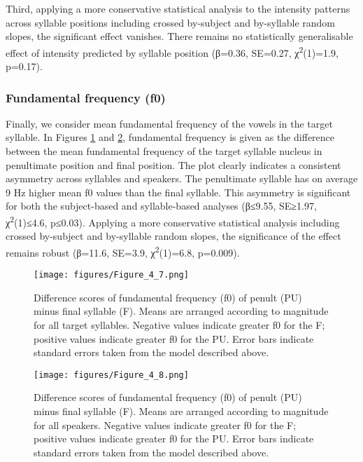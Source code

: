 Third, applying a more conservative statistical analysis to the intensity patterns across syllable positions including crossed by-subject and by-syllable random slopes, the significant effect vanishes. There remains no statistically generalisable effect of intensity predicted by syllable position (β=0.36, SE=0.27, χ\textsuperscript{2}(1)=1.9, p=0.17).

\subsubsection{Fundamental frequency (f0)}
Finally, we consider mean fundamental frequency of the vowels in the target syllable. In Figures \ref{fig:4.7} and \ref{fig:4.8}, fundamental frequency is given as the difference between the mean fundamental frequency of the target syllable nucleus in penultimate position and final position. The plot clearly indicates a consistent asymmetry across syllables and speakers. The penultimate syllable has on average 9 Hz higher mean f0 values than the final syllable. This asymmetry is significant for both the subject-based and syllable-based analyses (β≤9.55, SE≥1.97, χ\textsuperscript{2}(1)≤4.6, p≤0.03). Applying a more conservative statistical analysis including crossed by-subject and by-syllable random slopes, the significance of the effect remains robust (β=11.6, SE=3.9, χ\textsuperscript{2}(1)=6.8, p=0.009).

\begin{figure}
  \centering 
   \texttt{[image: figures/Figure\_4\_7.png]}
  \caption{Difference scores of fundamental frequency (f0) of penult (PU) minus final syllable (F). Means are arranged according to magnitude for all target syllables. Negative values indicate greater f0 for the F; positive values indicate greater f0 for the PU. Error bars indicate standard errors taken from the model described above.}
   \label{fig:4.7}
   \end{figure}

\begin{figure}
  \centering 
   \texttt{[image: figures/Figure\_4\_8.png]}
  \caption{Difference scores of fundamental frequency (f0) of penult (PU) minus final syllable (F). Means are arranged according to magnitude for all speakers. Negative values indicate greater f0 for the F; positive values indicate greater f0 for the PU. Error bars indicate standard errors taken from the model described above.}
   \label{fig:4.8}
   \end{figure}

